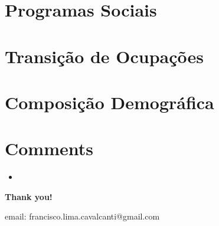 \documentclass[11pt]{beamer}
\begin{document}


\section{Programas Sociais}

%

\section{Transição de Ocupações}

%

\section{Composição Demográfica}

%

\section{Comments}



\begin{frame}{}

\begin{itemize}
	\item{}	
\end{itemize}


\end{frame}

\frame
{
    \begin{center}
     \vfill
    \textbf{Thank you!}
     \\

     \begin{small}
     email: francisco.lima.cavalcanti@gmail.com
     \end{small}
     \vfill
\end{center}
}
\end{document}
